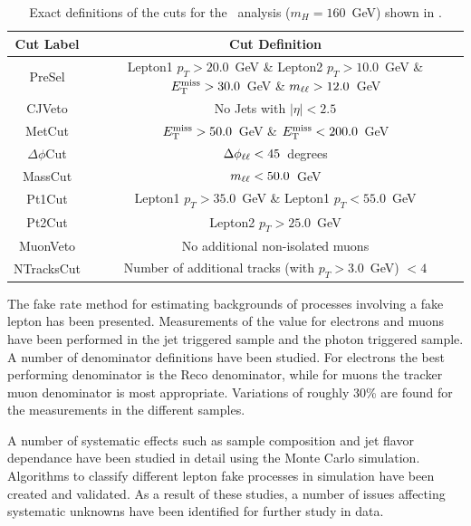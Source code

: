 \documentclass{cmspaper}
\begin{document}
\begin{table}[ht]
  \begin{center}
    \footnotesize  
    \begin{tabular}{|c|c|}\hline 
      Cut Label & Cut Definition \\ 
      \hline 
      PreSel & Lepton1 $p_T > 20.0$~GeV \& Lepton2 $p_T > 10.0$~GeV \& $E_\mathrm{T}^{\mathrm{miss}} > 30.0$~GeV \& $m_{\ell\ell} > 12.0$~GeV \\ 
      CJVeto & No Jets with $|\eta| < 2.5$ \\ 
      MetCut & $E_\mathrm{T}^{\mathrm{miss}} > 50.0$~GeV \& $E_\mathrm{T}^{\mathrm{miss}} < 200.0$~GeV \\ 
      $\Delta\phi$Cut &  $\Delta\phi_{\ell\ell} < 45$~degrees \\ 
      MassCut & $m_{\ell\ell} < 50.0$~GeV \\ 
      Pt1Cut & Lepton1 $p_T > 35.0$~GeV \& Lepton1 $p_T < 55.0$~GeV \\ 
      Pt2Cut & Lepton2 $p_T > 25.0$~GeV  \\ 
      MuonVeto & No additional non-isolated muons\\ 
      NTracksCut & Number of additional tracks (with $p_T > 3.0$~GeV) $ < 4$ \\ 
      \hline 
    \end{tabular}         
  \end{center}
  \caption{\label{tab:HWWCuts} Exact definitions of the cuts for the \HiggsToWW\ analysis ($m_{H} = 160$~GeV) shown in . }
\end{table}




The fake rate method for estimating backgrounds of processes involving a fake lepton has been presented. Measurements of the \epsilonFake value for electrons and muons have been performed in the jet triggered sample and the photon triggered sample. A number of denominator definitions have been studied. For electrons the best performing denominator is the Reco denominator, while for muons the tracker muon denominator is most appropriate. Variations of roughly 30\% are found for the measurements in the different samples.

A number of systematic effects such as sample composition and jet flavor dependance have been studied in detail using the Monte Carlo simulation. Algorithms to classify different lepton fake processes in simulation have been created and validated. As a result of these studies, a number of issues affecting systematic unknowns have been identified for further study in data.
\end{document}
